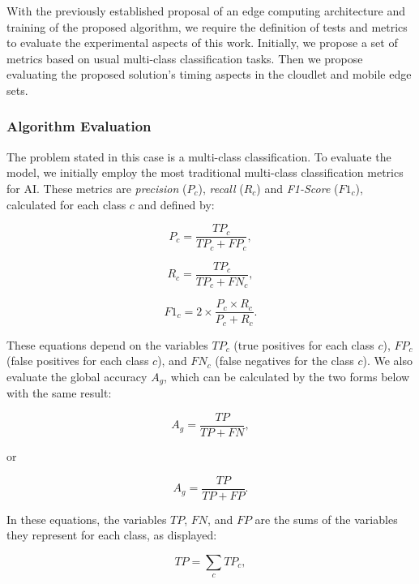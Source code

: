 With the previously established proposal of an edge computing architecture and training of the proposed algorithm, we require the definition of tests and metrics to evaluate the experimental aspects of this work. Initially, we propose a set of metrics based on usual multi-class classification tasks. Then we propose evaluating the proposed solution's timing aspects in the cloudlet and mobile edge sets.

\subsubsection{Algorithm Evaluation}

The problem stated in this case is a multi-class classification. To evaluate the model, we initially employ the most traditional multi-class classification metrics for AI. These metrics are \textit{precision} ($P_c$), \textit{recall} ($R_c$) and \textit{F1-Score} ($F1_c$), calculated for each class $c$ and defined by:

\begin{equation}
    P_c = \frac{TP_c}{TP_c+FP_c},
\end{equation}

\begin{equation}
    R_c = \frac{TP_c}{TP_c+FN_c},
\end{equation}

\begin{equation}
    F1_c = 2 \times \frac{P_c \times R_c}{P_c + R_c}.
\end{equation}

These equations depend on the variables $TP_c$ (true positives for each class $c$), $FP_c$ (false positives for each class $c$), and $FN_c$ (false negatives for the class $c$). We also evaluate the global accuracy $A_g$, which can be calculated by the two forms below with the same result:

\begin{equation}
    A_g = \frac{TP}{TP + FN},
\end{equation}

or

\begin{equation}
    A_g = \frac{TP}{TP + FP}.
\end{equation}

In these equations, the variables $TP$, $FN$, and $FP$ are the sums of the variables they represent for each class, as displayed:

\begin{equation}
    TP = \sum_c TP_c,
\end{equation}

